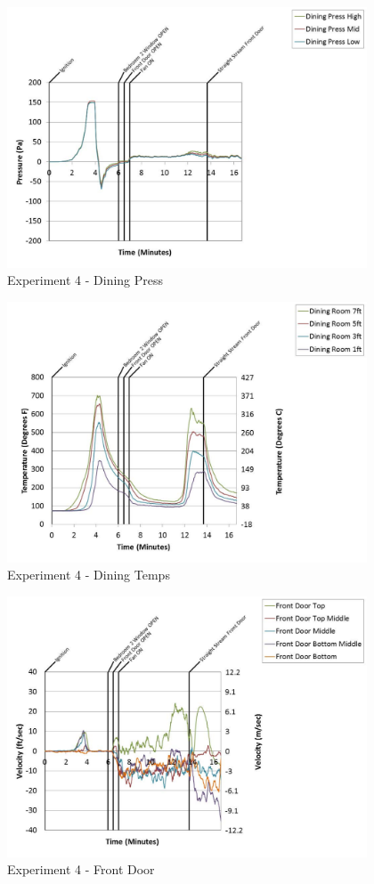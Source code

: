 \documentclass{article}
\begin{document}
\begin{appendices}
	\clearpage

	\begin{figure}[h!]
		\centering
		\includegraphics[height=3.05in]{0_Images/Results_Charts/Exp_4_Charts/DiningPress.pdf}
		\caption{Experiment 4 - Dining Press}
	\end{figure}
 

	\begin{figure}[h!]
		\centering
		\includegraphics[height=3.05in]{0_Images/Results_Charts/Exp_4_Charts/DiningTemps.pdf}
		\caption{Experiment 4 - Dining Temps}
	\end{figure}
 
	\clearpage

	\begin{figure}[h!]
		\centering
		\includegraphics[height=3.05in]{0_Images/Results_Charts/Exp_4_Charts/FrontDoor.pdf}
		\caption{Experiment 4 - Front Door}
	\end{figure}
 


\end{appendices}
\end{document}
